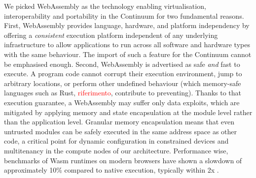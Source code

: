 We picked WebAssembly as the technology enabling virtualisation, interoperability and portability in the Continuum for two fundamental reasons. 
First, WebAssembly provides language, hardware, and platform independency by offering a \textit{consistent} execution platform independent of any underlying infrastructure to allow applications to run across all software and hardware types with the same behaviour. The import of such a feature for the Continuum cannot be emphasised enough.
Second, WebAssembly is advertised as safe \textit{and} fast to execute. A program code cannot corrupt their execution environment, jump to arbitrary locations, or perform other undefined behaviour (which memory-safe languages such as Rust, \textcolor{red}{riferimento}, contribute to preventing).  Thanks to that execution guarantee, a WebAssembly may suffer only data exploits, which are mitigated by applying memory and state encapsulation at the module level rather than the application level.
Granular memory encapsulation means that even untrusted modules can be safely executed in the same address space as other code, a critical point for dynamic configuration in constrained devices and multitenancy in the compute nodes of our architecture. Performance wise, benchmarks of Wasm runtimes on modern browsers have shown a slowdown of approximately 10\% compared to native execution, typically within 2x \cite{haas2017bringing, wasm-continuum}.

